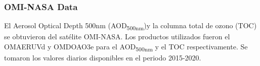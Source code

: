 \subsubsection{OMI-NASA Data}
El Aerosol Optical Depth 500nm (AOD\textsubscript{500nm})y la columna total de ozono (TOC) se obtuvieron del satélite OMI-NASA. Los productos utilizados fueron el OMAERUVd \cite{OMI_AOD} y OMDOAO3e \cite{OMI_ozone} para el AOD\textsubscript{500nm} y el TOC respectivamente. Se tomaron los valores diarios disponibles en el periodo 2015-2020.